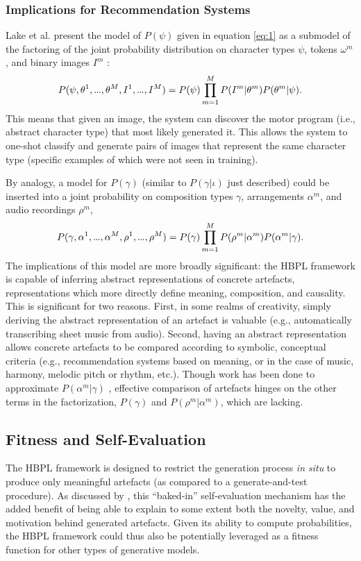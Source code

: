 \documentclass[phd,electronic,oneside,twosidetoc,letterpaper,chaptercenter,parttop,lol,lof,lot]{byumsphd}
\newcommand\mydots{\hbox to .75em{.\hss.\hss.}}
\begin{document}
\subsubsection{Implications for Recommendation Systems}

Lake et al. present the model of $P(\psi)$ given in equation \ref{eq:1} as a submodel of the factoring of the joint probability distribution on character types $\psi$, tokens $\omega^m$, and binary images $I^m$ \cite{lake2015human}:
\small
\[ P(\psi, \theta^1, \mydots,\theta^M,I^1,\mydots,I^M) = P(\psi) \prod_{m=1}^{M} P(I^m|\theta^m)P(\theta^m|\psi). \]
\normalsize
This means that given an image, the system can discover the motor program (i.e., abstract character type) that most likely generated it. This allows the system to one-shot classify and generate pairs of images that represent the same character type (specific examples of which were not seen in training). 

By analogy, a model for $P(\gamma)$ (similar to $P(\gamma|\iota)$ just described) could be inserted into a joint probability on composition types $\gamma$, arrangements $\alpha^m$, and audio recordings $\rho^m$,
\small
\[ P(\gamma,\alpha^1,\mydots,\alpha^M,\rho^1,\mydots, \rho^M) = P(\gamma) \prod_{m=1}^M P(\rho^m|\alpha^m)P(\alpha^m|\gamma). \]
\normalsize
The implications of this model are more broadly significant: the HBPL framework is capable of inferring abstract representations of concrete artefacts, representations which more directly define meaning, composition, and causality. This is significant for two reasons. First, in some realms of creativity, simply deriving the abstract representation of an artefact is valuable (e.g., automatically transcribing sheet music from audio). Second, having an abstract representation allows concrete artefacts to be compared according to symbolic, conceptual criteria (e.g., recommendation systems based on meaning, or in the case of music, harmony, melodic pitch or rhythm, etc.). Though work has been done to approximate $P(\alpha^m|\gamma)$ \cite{benetos2013automatic}, effective comparison of artefacts hinges on the other terms in the factorization, $P(\gamma)$ and $P(\rho^m|\alpha^m)$, which are lacking.

\subsection{Fitness and Self-Evaluation}

The HBPL framework is designed to restrict the generation process \emph{in situ} to produce only meaningful artefacts (as compared to a generate-and-test procedure). As discussed by \citeauthor{Ventura2016} \cite{Ventura2016}, this ``baked-in'' self-evaluation mechanism has the added benefit of being able to explain to some extent both the novelty, value, and motivation behind generated artefacts. Given its ability to compute probabilities, the HBPL framework could thus also be potentially leveraged as a fitness function for other types of generative models.
\end{document}
